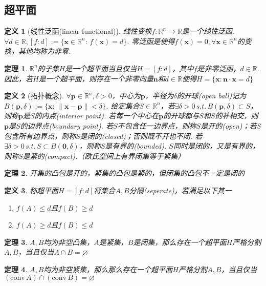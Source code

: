 \documentclass[11pt,UTF8]{ctexart}
\newtheorem{theorem}{定理}
\newtheorem{definition}{定义}
\def\vx{\mathbf{x}}
\def\rn{\mathbb{R}^n}
\def\conv{\mathrm{conv}\,}
\newcommand{\vb}[1]{\mathbf{#1}}
\begin{document}
\subsection{超平面}
\begin{definition}[线性泛函(linear functional)]
线性变换$f:\rn\to\mathbb{R}$是一个线性泛函. $\forall d\in\mathbb{R},[f:d]:=\{\vx\in\rn:\,f(\vx)=d\}$. 零泛函是使得$f(\vx)=0,\forall\vx\in\rn$的变换，其他均称为非零.
\end{definition}
\begin{theorem}
$\rn$的子集$H$是一个超平面当且仅当$H=[f:d]$，其中$f$是非零泛函，$d\in\mathbb{R}$. 因此，若$H$是一个超平面，则存在一个非零向量$\vb{n}$和$d\in\mathbb{R}$使得$H=\{\vx:\vb{n}\cdot\vx=d\}$
\end{theorem}
\begin{definition}[拓扑概念]
\rm $\forall\vb{p}\in\rn,\delta>0$，中心为$\vb{p}$，半径为$\delta$的开球(open ball)记为$B(\vb{p},\delta):=\{\vx:\,\|\vx-\vb{p}\|<\delta\}$. 给定集合$S\in\rn$，若$\exists\delta>0\,s.t.\,B(\vb{p},\delta)\subset S$，则称$\vb{p}$是$S$的内点(interior point). 若每一个中心在$\vb{p}$的开球都与$S$和$S$的补相交，则$\vb{p}$是$S$的边界点(boundary point). 若$S$不包含任一边界点，则称$S$是开的(open)；若$S$包含所有边界点，则称$S$是闭的(closed)；否则既不开也不闭. 若$\exists\delta>0\,s.t.\,S\subset B(\vb{0},\delta)$，则称$S$是有界的(bounded). $S$同时是闭的，又是有界的，则称$S$是紧的(compact).（欧氏空间上有界闭集等于紧集）
\end{definition}
\begin{theorem}
开集的凸包是开的，紧集的凸包是紧的，但闭集的凸包不一定是闭的
\end{theorem}
\begin{definition}
\rm 称超平面$H=[f:d]$将集合$A,B$分隔(seperate)，若满足以下其一
\begin{enumerate}
	\itemsep -3pt
	\item $f(A)\leq d$且$f(B)\geq d$
	\item $f(A)\geq d$且$f(B)\leq d$
\end{enumerate}
\end{definition}
\begin{theorem}
$A,B$均为非空凸集，$A$是紧集，$B$是闭集，那么存在一个超平面$H$严格分割$A,B$，当且仅当$A\cap B=\varnothing$
\end{theorem}
\begin{theorem}
$A,B$均为非空紧集，那么那么存在一个超平面$H$严格分割$A,B$，当且仅当$(\conv A)\cap (\conv B)=\varnothing$
\end{theorem}
\end{document}
